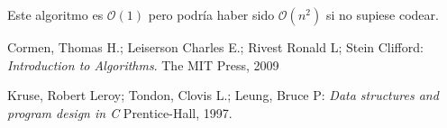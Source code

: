 \documentclass[a4paper]{article}
\newcommand{\bigO}[1]{\(\mathcal{O}(#1)\)}
\begin{document}
Este algoritmo es \bigO{1} pero podría haber sido \bigO{n^2} si no supiese codear.

\newpage


{} 
\begin{thebibliography}{9}
Cormen, Thomas H.; Leiserson Charles E.; Rivest Ronald L; Stein Clifford:
\textit{Introduction to Algorithms}. 
The MIT Press, 2009

\end{thebibliography}
{}
\renewcommand\refname{Bibliografía}
\begin{thebibliography}{9}

Kruse, Robert Leroy; Tondon, Clovis L.; Leung, Bruce P: 
\textit{Data structures and program design in C}
Prentice-Hall, 1997.

\end{thebibliography}
\end{document}
